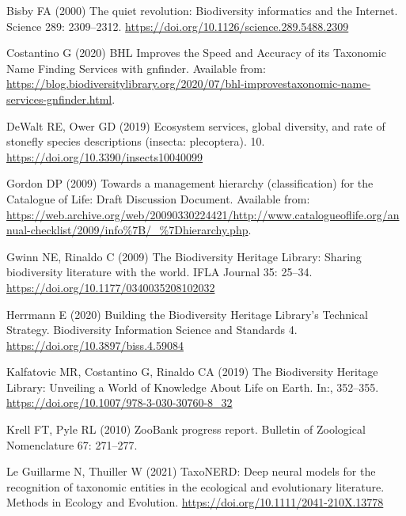 \documentclass[
]{article}
\newlength{\cslhangindent}
\newlength{\cslentryspacingunit} %
\newenvironment{CSLReferences}[2] %
 {%
  \setlength{\parindent}{0pt}
  \ifodd #1
  \let\oldpar\par
  \def\par{\hangindent=\cslhangindent\oldpar}
  \fi
  \setlength{\parskip}{#2\cslentryspacingunit}
 }%
 {}
\begin{document}
\hypertarget{refs}{}
\begin{CSLReferences}{1}{0}
\leavevmode{}%
Bisby FA (2000) {The quiet revolution: Biodiversity informatics and the
Internet}. Science 289: 2309--2312.
\url{https://doi.org/10.1126/science.289.5488.2309}

\leavevmode{}%
Costantino G (2020) {BHL Improves the Speed and Accuracy of its
Taxonomic Name Finding Services with gnfinder}. Available from:
\url{https://blog.biodiversitylibrary.org/2020/07/bhl-improvestaxonomic-name-services-gnfinder.html}.

\leavevmode{}%
DeWalt RE, Ower GD (2019) Ecosystem services, global diversity, and rate
of stonefly species descriptions (insecta: plecoptera). 10.
\url{https://doi.org/10.3390/insects10040099}

\leavevmode{}%
Gordon DP (2009) {Towards a management hierarchy (classification) for
the Catalogue of Life: Draft Discussion Document}. Available from:
\url{https://web.archive.org/web/20090330224421/http://www.catalogueoflife.org/annual-checklist/2009/info\%7B/_\%7Dhierarchy.php}.

\leavevmode{}%
Gwinn NE, Rinaldo C (2009) {The Biodiversity Heritage Library: Sharing
biodiversity literature with the world}. IFLA Journal 35: 25--34.
\url{https://doi.org/10.1177/0340035208102032}

\leavevmode{}%
Herrmann E (2020) {Building the Biodiversity Heritage Library's
Technical Strategy}. Biodiversity Information Science and Standards 4.
\url{https://doi.org/10.3897/biss.4.59084}

\leavevmode{}%
Kalfatovic MR, Costantino G, Rinaldo CA (2019) {The Biodiversity
Heritage Library: Unveiling a World of Knowledge About Life on Earth}.
In:, 352--355. \url{https://doi.org/10.1007/978-3-030-30760-8_32}

\leavevmode{}%
Krell FT, Pyle RL (2010) {ZooBank progress report}. Bulletin of
Zoological Nomenclature 67: 271--277.

\leavevmode{}%
Le Guillarme N, Thuiller W (2021) {TaxoNERD: Deep neural models for the
recognition of taxonomic entities in the ecological and evolutionary
literature}. Methods in Ecology and Evolution.
\url{https://doi.org/10.1111/2041-210X.13778}


\end{CSLReferences}
\end{document}
